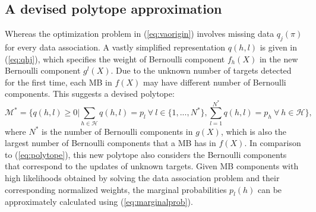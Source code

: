 \subsection{A devised polytope approximation}
Whereas the optimization problem in (\ref{eq:vaorigin}) involves missing data $q_j(\pi)$ for every data association. A vastly simplified representation $q(h,l)$ is given in (\ref{eq:qhj}), which specifies the weight of Bernoulli component $f_h(X)$ in the new Bernoulli component $g^l(X)$. Due to the unknown number of targets detected for the first time, each MB in $f(X)$ may have different number of Bernoulli components. This suggests a devised polytope: 
\begin{equation}
    \mathcal{M}^* = \Bigg\{q(h,l)\geq0\Bigg|\sum_{h\in\mathcal{H}}q(h,l)=p_l ~\forall~ l\in\{1,...,N^*\},\sum^{N^*}_{l=1}q(h,l)=p_h ~\forall~ h\in\mathcal{H}\Bigg\}, 
\end{equation}
where $N^*$ is the number of Bernoulli components in $g(X)$, which is also the largest number of Bernoulli components that a MB has in $f(X)$. In comparison to (\ref{eq:polytope}), this new polytope also considers the Bernoulli components that correspond to the updates of unknown targets. Given MB components with high likelihoods obtained by solving the data association problem and their corresponding normalized weights, the marginal probabilities $p_l(h)$ can be approximately calculated using (\ref{eq:marginalprob}). 

